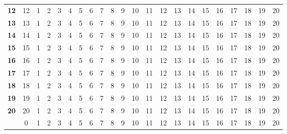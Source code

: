 \documentclass[10pt]{article}
\begin{document}
\begin{table}[ht]
\begin{tabu}{|>{\bfseries}c|ccc|ccc|ccc|ccc|ccc|ccc|ccc|}
    12 & 12 & 1 & 2 & 3 & 4 & 5 & 6 & 7 & 8 & 9 & 10 & 11 & 12 & 13 & 14 & 15 & 16 & 17 & 18 & 19 & 20\\
    13 & 13 & 1 & 2 & 3 & 4 & 5 & 6 & 7 & 8 & 9 & 10 & 11 & 12 & 13 & 14 & 15 & 16 & 17 & 18 & 19 & 20\\
    14 & 14 & 1 & 2 & 3 & 4 & 5 & 6 & 7 & 8 & 9 & 10 & 11 & 12 & 13 & 14 & 15 & 16 & 17 & 18 & 19 & 20\\

    15 & 15 & 1 & 2 & 3 & 4 & 5 & 6 & 7 & 8 & 9 & 10 & 11 & 12 & 13 & 14 & 15 & 16 & 17 & 18 & 19 & 20\\
    16 & 16 & 1 & 2 & 3 & 4 & 5 & 6 & 7 & 8 & 9 & 10 & 11 & 12 & 13 & 14 & 15 & 16 & 17 & 18 & 19 & 20\\
    17 & 17 & 1 & 2 & 3 & 4 & 5 & 6 & 7 & 8 & 9 & 10 & 11 & 12 & 13 & 14 & 15 & 16 & 17 & 18 & 19 & 20\\

    18 & 18 & 1 & 2 & 3 & 4 & 5 & 6 & 7 & 8 & 9 & 10 & 11 & 12 & 13 & 14 & 15 & 16 & 17 & 18 & 19 & 20\\
    19 & 19 & 1 & 2 & 3 & 4 & 5 & 6 & 7 & 8 & 9 & 10 & 11 & 12 & 13 & 14 & 15 & 16 & 17 & 18 & 19 & 20\\
    20 & 20 & 1 & 2 & 3 & 4 & 5 & 6 & 7 & 8 & 9 & 10 & 11 & 12 & 13 & 14 & 15 & 16 & 17 & 18 & 19 & 20\\

    \rowfont{\bfseries}
       & 0 & 1 & 2 & 3 & 4 & 5 & 6 & 7 & 8 & 9 & 10 & 11 & 12 & 13 & 14 & 15 & 16 & 17 & 18 & 19 & 20\\\hline

    \hline
  \end{tabu}
\end{table}
\end{document}

